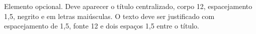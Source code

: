 \begin{agradecimentos}

Elemento opcional. Deve aparecer o título centralizado, corpo 12, espacejamento 1,5, negrito e em letras maiúsculas. O texto deve ser justificado com espacejamento de 1,5, fonte 12 e dois espaços 1,5 entre o título.

\end{agradecimentos}